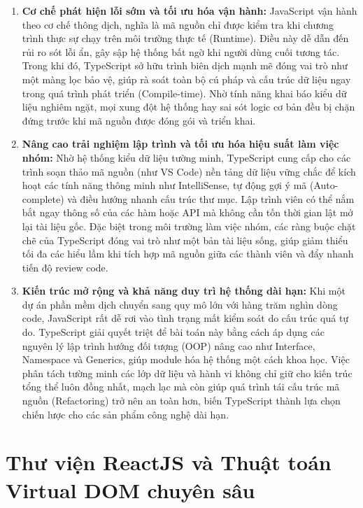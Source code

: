 \documentclass[../main.tex]{subfiles}
\begin{document}
\begin{enumerate}
    \item \textbf{Cơ chế phát hiện lỗi sớm và tối ưu hóa vận hành:} JavaScript vận hành theo cơ chế thông dịch, nghĩa là mã nguồn chỉ được kiểm tra khi chương trình thực sự chạy trên môi trường thực tế (Runtime). Điều này dễ dẫn đến rủi ro sót lỗi ẩn, gây sập hệ thống bất ngờ khi người dùng cuối tương tác. Trong khi đó, TypeScript sở hữu trình biên dịch mạnh mẽ đóng vai trò như một màng lọc bảo vệ, giúp rà soát toàn bộ cú pháp và cấu trúc dữ liệu ngay trong quá trình phát triển (Compile-time). Nhờ tính năng khai báo kiểu dữ liệu nghiêm ngặt, mọi xung đột hệ thống hay sai sót logic cơ bản đều bị chặn đứng trước khi mã nguồn được đóng gói và triển khai.
    \item \textbf{Nâng cao trải nghiệm lập trình và tối ưu hóa hiệu suất làm việc nhóm:} Nhờ hệ thống kiểu dữ liệu tường minh, TypeScript cung cấp cho các trình soạn thảo mã nguồn (như VS Code) nền tảng dữ liệu vững chắc để kích hoạt các tính năng thông minh như IntelliSense, tự động gợi ý mã (Auto-complete) và điều hướng nhanh cấu trúc thư mục. Lập trình viên có thể nắm bắt ngay thông số của các hàm hoặc API mà không cần tốn thời gian lật mở lại tài liệu gốc. Đặc biệt trong môi trường làm việc nhóm, các ràng buộc chặt chẽ của TypeScript đóng vai trò như một bản tài liệu sống, giúp giảm thiểu tối đa các hiểu lầm khi tích hợp mã nguồn giữa các thành viên và đẩy nhanh tiến độ review code.
    \item \textbf{Kiến trúc mở rộng và khả năng duy trì hệ thống dài hạn:} Khi một dự án phần mềm dịch chuyển sang quy mô lớn với hàng trăm nghìn dòng code, JavaScript rất dễ rơi vào tình trạng mất kiểm soát do cấu trúc quá tự do. TypeScript giải quyết triệt để bài toán này bằng cách áp dụng các nguyên lý lập trình hướng đối tượng (OOP) nâng cao như Interface, Namespace và Generics, giúp module hóa hệ thống một cách khoa học. Việc phân tách tường minh các lớp dữ liệu và hành vi không chỉ giữ cho kiến trúc tổng thể luôn đồng nhất, mạch lạc mà còn giúp quá trình tái cấu trúc mã nguồn (Refactoring) trở nên an toàn hơn, biến TypeScript thành lựa chọn chiến lược cho các sản phẩm công nghệ dài hạn.
\end{enumerate}

\section{Thư viện ReactJS và Thuật toán Virtual DOM chuyên sâu}
\end{document}

